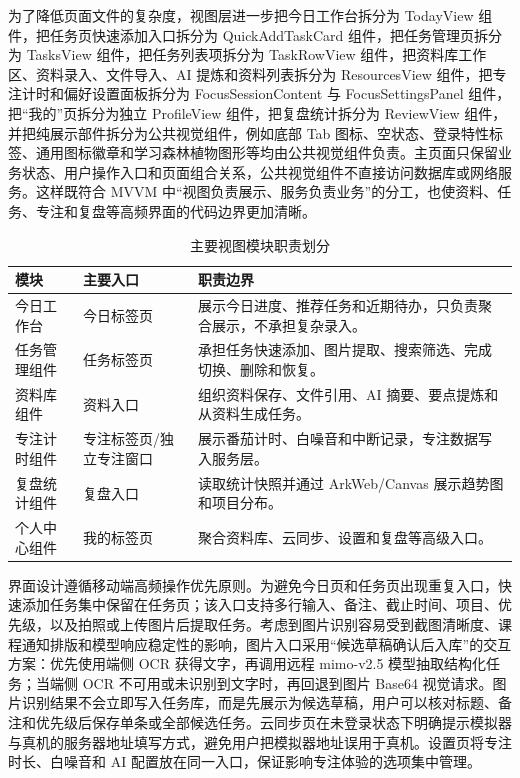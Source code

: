 为了降低页面文件的复杂度，视图层进一步把今日工作台拆分为 TodayView 组件，把任务页快速添加入口拆分为 QuickAddTaskCard 组件，把任务管理页拆分为 TasksView 组件，把任务列表项拆分为 TaskRowView 组件，把资料库工作区、资料录入、文件导入、AI 提炼和资料列表拆分为 ResourcesView 组件，把专注计时和偏好设置面板拆分为 FocusSessionContent 与 FocusSettingsPanel 组件，把“我的”页拆分为独立 ProfileView 组件，把复盘统计拆分为 ReviewView 组件，并把纯展示部件拆分为公共视觉组件，例如底部 Tab 图标、空状态、登录特性标签、通用图标徽章和学习森林植物图形等均由公共视觉组件负责。主页面只保留业务状态、用户操作入口和页面组合关系，公共视觉组件不直接访问数据库或网络服务。这样既符合 MVVM 中“视图负责展示、服务负责业务”的分工，也使资料、任务、专注和复盘等高频界面的代码边界更加清晰。

\begin{table}[htbp]
\centering
\small
\caption{主要视图模块职责划分}
\begin{tabularx}{\textwidth}{p{3.0cm}p{3.7cm}X}
\toprule
模块 & 主要入口 & 职责边界 \\
\midrule
今日工作台 & 今日标签页 & 展示今日进度、推荐任务和近期待办，只负责聚合展示，不承担复杂录入。 \\
任务管理组件 & 任务标签页 & 承担任务快速添加、图片提取、搜索筛选、完成切换、删除和恢复。 \\
资料库组件 & 资料入口 & 组织资料保存、文件引用、AI 摘要、要点提炼和从资料生成任务。 \\
专注计时组件 & 专注标签页/独立专注窗口 & 展示番茄计时、白噪音和中断记录，专注数据写入服务层。 \\
复盘统计组件 & 复盘入口 & 读取统计快照并通过 ArkWeb/Canvas 展示趋势图和项目分布。 \\
个人中心组件 & 我的标签页 & 聚合资料库、云同步、设置和复盘等高级入口。 \\
\bottomrule
\end{tabularx}
\end{table}

界面设计遵循移动端高频操作优先原则。为避免今日页和任务页出现重复入口，快速添加任务集中保留在任务页；该入口支持多行输入、备注、截止时间、项目、优先级，以及拍照或上传图片后提取任务。考虑到图片识别容易受到截图清晰度、课程通知排版和模型响应稳定性的影响，图片入口采用“候选草稿确认后入库”的交互方案：优先使用端侧 OCR 获得文字，再调用远程 mimo-v2.5 模型抽取结构化任务；当端侧 OCR 不可用或未识别到文字时，再回退到图片 Base64 视觉请求。图片识别结果不会立即写入任务库，而是先展示为候选草稿，用户可以核对标题、备注和优先级后保存单条或全部候选任务。云同步页在未登录状态下明确提示模拟器与真机的服务器地址填写方式，避免用户把模拟器地址误用于真机。设置页将专注时长、白噪音和 AI 配置放在同一入口，保证影响专注体验的选项集中管理。

